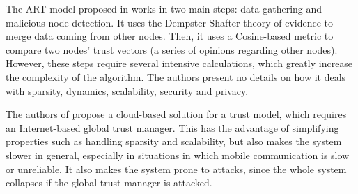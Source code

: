 The ART model proposed in \cite{li2016art} works in two main steps: data gathering and malicious node detection.
It uses the Dempster-Shafter theory of evidence to merge data coming from other nodes.
Then, it uses a Cosine-based metric to compare two nodes' trust vectors (a series of opinions regarding other nodes).
However, these steps require several intensive calculations, which greatly increase the complexity of the algorithm.
The authors present no details on how it deals with sparsity, dynamics, scalability, security and privacy.

The authors of \cite{chen2017cloud} propose a cloud-based solution for a trust model, which requires an Internet-based global trust manager.
This has the advantage of simplifying properties such as handling sparsity and scalability, but also makes the system slower in general, especially in situations in which mobile communication is slow or unreliable.
It also makes the system prone to attacks, since the whole system collapses if the global trust manager is attacked.



